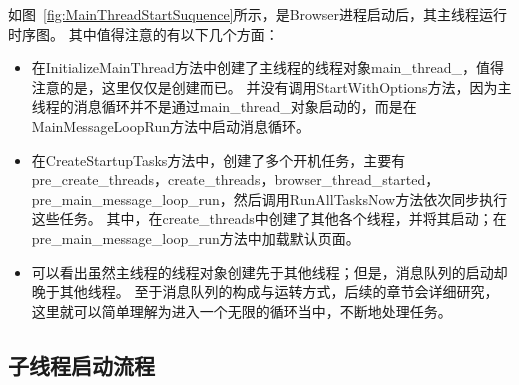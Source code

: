 如图~\ref{fig:MainThreadStartSuquence}所示，是Browser进程启动后，其主线程运行时序图。
其中值得注意的有以下几个方面：
\begin{itemize}
  \item 在InitializeMainThread方法中创建了主线程的线程对象main\_thread\_，值得注意的是，这里仅仅是创建而已。
  并没有调用StartWithOptions方法，因为主线程的消息循环并不是通过main\_thread\_对象启动的，而是在MainMessageLoopRun方法中启动消息循环。
  \item 在CreateStartupTasks方法中，创建了多个开机任务，主要有pre\_create\_threads，create\_threads，browser\_thread\_started，
  pre\_main\_message\_loop\_run，然后调用RunAllTasksNow方法依次同步执行这些任务。
  其中，在create\_threads中创建了其他各个线程，并将其启动；在pre\_main\_message\_loop\_run方法中加载默认页面。
  \item 可以看出虽然主线程的线程对象创建先于其他线程；但是，消息队列的启动却晚于其他线程。
  至于消息队列的构成与运转方式，后续的章节会详细研究，这里就可以简单理解为进入一个无限的循环当中，不断地处理任务。
\end{itemize}

\subsection{子线程启动流程}



%
%
%
